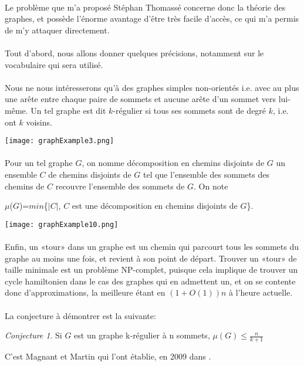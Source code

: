 \documentclass[a4paper]{article}
\theoremstyle{definition}
\theoremstyle{remark}
\newtheorem{conjecture}{Conjecture}[section]
\begin{document}
\paragraph{}
Le problème que m'a proposé Stéphan Thomassé concerne donc la théorie 
des graphes, et possède l'énorme avantage d'être très facile d'accès, ce qui m'a permis de m'y attaquer directement.


\paragraph{}
Tout d'abord, nous allons donner quelques précisions, notamment sur le vocabulaire qui sera utilisé.


\paragraph{}
Nous ne nous intéresserons qu'à des graphes simples non-orientés i.e. avec au plus une arête entre chaque paire de sommets et aucune arête
d'un sommet vers lui-même. Un tel graphe est dit $k$-régulier si tous ses
sommets sont de degré $k$, i.e. ont $k$ voisins.


\texttt{[image: graphExample3.png]}


\paragraph{}
Pour un tel graphe $G$, on nomme décomposition en chemins disjoints de $G$  un ensemble $C$ de chemins disjoints de $G$ tel que l'ensemble des sommets des chemins 
de $C$ recouvre l'ensemble des sommets de $G$. On note


$\mu$($G$)=$min$\{$|C|$, $C$ est une décomposition en chemins disjoints de $G$\}.

\texttt{[image: graphExample10.png]}

\paragraph{}
Enfin, un «tour» dans un graphe est un chemin qui parcourt tous les sommets
du graphe au moins une fois, et revient à son point de départ. Trouver
un «tour» de taille minimale est un problème NP-complet, puisque cela implique de trouver un cycle hamiltonien dans le cas des graphes qui en admettent un, et on se contente donc d'approximations, la meilleure étant en $(1+O(1))n$ à l'heure actuelle.

\paragraph{}
La conjecture à démontrer est la suivante:
\begin{conjecture}
Si $G$ est un graphe k-régulier à n sommets, $\mu(G) \leq \frac{n}{k+1}$
\end{conjecture}
C'est Magnant et Martin qui l'ont établie, en 2009 dans \cite{MagnantMartin}.
\end{document}
